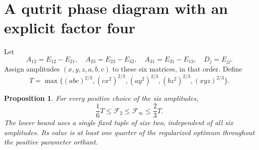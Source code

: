 \documentclass[11pt]{article}
\newtheorem{proposition}[theorem]{Proposition}
\newcommand{\F}{\mathcal F}
\begin{document}
\section{A qutrit phase diagram with an explicit factor four}
Let
\[
 A_{12}=E_{12}-E_{21},\quad A_{23}=E_{23}-E_{32},\quad
 A_{31}=E_{31}-E_{13},\quad D_j=E_{jj}.
\]
Assign amplitudes $(x,y,z,a,b,c)$ to these six matrices, in that order. Define
\begin{equation}
 T=\max\{(abc)^{2/3},(cx^2)^{2/3},(ay^2)^{2/3},
                 (bz^2)^{2/3},(xyz)^{2/3}\}.\label{eq:T}
\end{equation}
\begin{proposition}\label{prop:example}
For every positive choice of the six amplitudes,
\[
 \frac16T\le\F_2\le\F_\infty\le\frac23T.
\]
The lower bound uses a single fixed tuple of size two, independent of all six amplitudes. Its value is at least one quarter of the regularized optimum throughout the positive parameter orthant.
\end{proposition}
\end{document}
